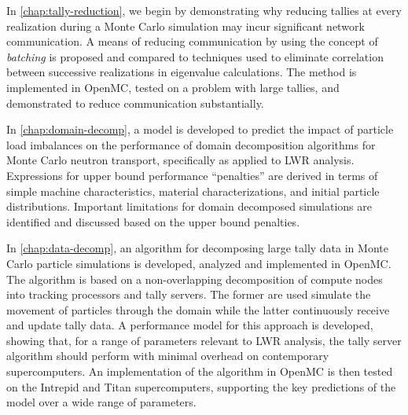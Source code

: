 In \autoref{chap:tally-reduction}, we begin by demonstrating why reducing
tallies at every realization during a Monte Carlo simulation may incur
significant network communication. A means of reducing communication by using
the concept of \emph{batching} is proposed and compared to techniques used to
eliminate correlation between successive realizations in eigenvalue
calculations. The method is implemented in OpenMC, tested on a problem with
large tallies, and demonstrated to reduce communication substantially.

In \autoref{chap:domain-decomp}, a model is developed to predict the impact of
particle load imbalances on the performance of domain decomposition algorithms
for Monte Carlo neutron transport, specifically as applied to LWR
analysis. Expressions for upper bound performance ``penalties'' are derived in
terms of simple machine characteristics, material characterizations, and initial
particle distributions. Important limitations for domain decomposed simulations
are identified and discussed based on the upper bound penalties.


In \autoref{chap:data-decomp}, an algorithm for decomposing large tally data in
Monte Carlo particle simulations is developed, analyzed and implemented in
OpenMC. The algorithm is based on a non-overlapping decomposition of compute
nodes into tracking processors and tally servers. The former are used simulate
the movement of particles through the domain while the latter continuously
receive and update tally data. A performance model for this approach is
developed, showing that, for a range of parameters relevant to LWR analysis, the
tally server algorithm should perform with minimal overhead on contemporary
supercomputers. An implementation of the algorithm in OpenMC is then tested on
the Intrepid and Titan supercomputers, supporting the key predictions of the
model over a wide range of parameters.
